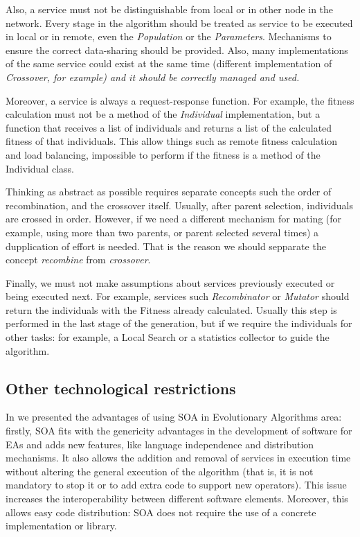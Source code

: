 \documentclass{sig-alternate}
\begin{document}
Also, a service must not be distinguishable from local or in other node in the network. Every stage in the algorithm should be treated as service to be executed in local or in remote, even the {\em Population} or the {\em Parameters}. Mechanisms to ensure the correct data-sharing should be provided. Also, many implementations of the same service could exist at the same time (different implementation of \em Crossover, for example) and it should be correctly managed and used.

Moreover, a service is always a request-response function. For example, the fitness calculation must not be a method of the {\em Individual} implementation, but a function that receives a list of individuals and returns a list of the calculated fitness of that individuals. This allow things such as remote fitness calculation and load balancing, impossible to perform if the fitness is a method of the Individual class.



Thinking as abstract as possible requires separate concepts such the order of recombination, and the crossover itself. Usually, after parent selection, individuals are crossed in order. However, if we need a different mechanism for mating (for example, using more than two parents, or parent selected several times) a dupplication of effort is needed. That is the reason we should sepparate the concept {\em recombine} from {\em crossover}. 

Finally, we must not make assumptions about services previously executed or being executed next. For example, services such {\em Recombinator} or {\em Mutator} should return the individuals with the Fitness already calculated. Usually this step is performed in the last stage of the generation, but if we require the individuals for other tasks: for example, a Local Search or a statistics collector to guide the algorithm.

\subsection{Other technological restrictions}

In \cite{OSGILIATH} we presented the advantages of using SOA in Evolutionary Algorithms area: firstly, SOA fits with the genericity advantages in the development of software for EAs \cite{GENERICITY05} and adds new features, like language independence and  distribution mechanisms. It also allows the addition and removal of services in execution time without altering the general execution of the algorithm (that is, it is not mandatory to stop it or to add extra code to support new operators). This issue increases the interoperability between different software elements. Moreover, this allows easy code distribution: SOA does not require the use of a concrete implementation or library.
\end{document}
